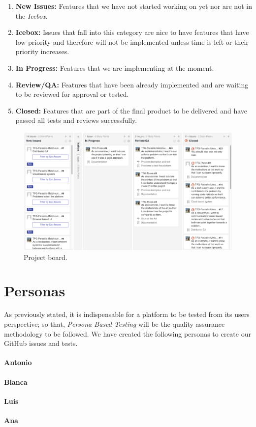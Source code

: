 \begin{enumerate}
	\item \textbf{New Issues:} Features that we have not started working on yet nor are not in the \textit{Icebox}.
	
	\item \textbf{Icebox:} Issues that fall into this category are nice to have features that have low-priority and therefore will not be implemented unless time is left or their priority increases.  
	
	\item \textbf{In Progress:} Features that we are implementing at the moment.
	
	\item \textbf{Review/QA:} Features that have been already implemented and are waiting to be reviewed for approval or tested.
	
	\item \textbf{Closed:} Features that are part of the final product to be delivered and have passed all tests and reviews successfully.
\end{enumerate}

\begin{figure}[h!]
		\centering
    	\includegraphics[width=\linewidth]{assets/images/board.png}
    	\caption{Project board.}
    	\label{fig:board}
\end{figure}


\section{Personas}
As previously stated, it is indispensable for a platform to be tested from its users perspective; so that, \textit{Persona Based Testing} will be the quality assurance methodology to be followed. We have created the following personas to create our GitHub issues and tests.

\paragraph*{Antonio}

\paragraph*{Blanca}

\paragraph*{Luis}

\paragraph*{Ana}
  